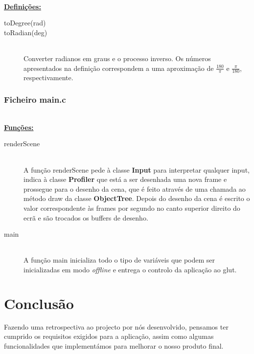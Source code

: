 \documentclass[a5paper,onecolumn, 11pt]{article}
\begin{document}
\hfill \\ \underline{\textbf{Definições:}}

\begin{description}
	\item[toDegree(rad)]
	\item[toRadian(deg)] \hfill \\
	Converter radianos em graus e o processo inverso. Os números apresentados na definição correspondem a uma aproximação de $\frac{180}{\pi}$ e $\frac{\pi}{180}$, respectivamente.
\end{description}

\clearpage
\subsubsection{Ficheiro main.c} \label{main.c}


\hfill \\ \underline{\textbf{Funções:}}

\begin{description}
	\item[renderScene] \hfill \\
	A função renderScene pede à classe \textbf{Input} para interpretar qualquer input, indica à classe \textbf{Profiler} que está a ser desenhada uma nova frame e prossegue para o desenho da cena, que é feito através de uma chamada ao método draw da classe \textbf{ObjectTree}. Depois do desenho da cena é escrito o valor correspondente às frames por segundo no canto superior direito do ecrã e são trocados os buffers de desenho.
	
	\item[main] \hfill \\
	A função main inicializa todo o tipo de variáveis que podem ser inicializadas em modo \textit{offline} e entrega o controlo da aplicação ao glut.
\end{description}


\clearpage
\section{Conclusão}
Fazendo uma retrospectiva ao projecto por nós desenvolvido, pensamos ter cumprido os requisitos exigidos para a aplicação, assim como algumas funcionalidades que implementámos para melhorar o nosso produto final.
\end{document}
